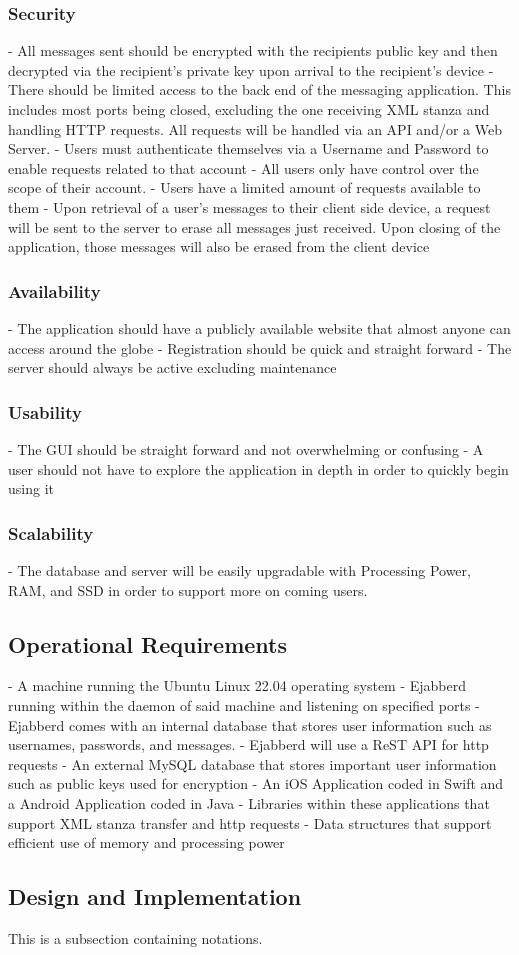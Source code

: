 \documentclass[11pt]{article}
\theoremstyle{plain}
\theoremstyle{definition}
\begin{document}
\subsubsection{Security}
- All messages sent should be encrypted with the recipients public key and then decrypted 
  via the recipient's private key upon arrival to the recipient's device
- There should be limited access to the back end of the messaging application. This 
  includes most ports being closed, excluding the one receiving XML stanza and handling HTTP requests. All requests will be handled via an API and/or a Web Server.
- Users must authenticate themselves via a Username and Password to enable requests related 
  to that account
- All users only have control over the scope of their account.
- Users have a limited amount of requests available to them
- Upon retrieval of a user's messages to their client side device, a request will be sent to the server to erase all messages just received. Upon closing of the application, those messages will also be erased from the client device
\subsubsection{Availability}
- The application should have a publicly available website that almost anyone can access 
  around the globe
- Registration should be quick and straight forward
- The server should always be active excluding maintenance
\subsubsection{Usability}
- The GUI should be straight forward and not overwhelming or confusing
- A user should not have to explore the application in depth in order to quickly begin using it
\subsubsection{Scalability}
- The database and server will be easily upgradable with Processing Power, RAM, and SSD in order to support more on coming users. 

\subsection{Operational Requirements}\label{sec:operationalrequirements}
- A machine running the Ubuntu Linux 22.04 operating system
- Ejabberd running within the daemon of said machine and listening on specified ports
- Ejabberd comes with an internal database that stores user information such as usernames, passwords, and messages.
- Ejabberd will use a ReST API for http requests
- An external MySQL database that stores important user information such as public keys 
  used for encryption
- An iOS Application coded in Swift and a Android Application coded in Java
- Libraries within these applications that support XML stanza transfer and http requests
- Data structures that support efficient use of memory and processing power

\subsection{Design and Implementation}\label{sec:designandimplementationrequirements}
This is a subsection containing notations.
\end{document}

